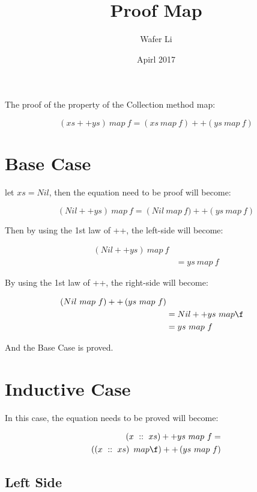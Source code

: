 \documentclass[12pt, letterpaper, twoside]{article}
\title{Proof Map}
\author{Wafer Li}
\date{Apirl 2017}
\begin{document}
\begin{titlepage}
\maketitle
\end{titlepage}

The proof of the property of the Collection method map:

$$
\left( xs ++ ys \right) \ map \ f = \left (xs \ map \ f \right) ++ \left(ys \ map \ f \right)
$$

\section{Base Case}

let $xs = Nil$, then the equation need to be proof will become:

$$
\left ( Nil ++ ys \right) \ map \ f = \left ( Nil \ map \ f) ++ \left(ys \ map \ f \right)
$$

Then by using the 1st law of ++, the left-side will become:

$$
\begin{aligned}
\left ( Nil ++ ys \right ) \ map \ f \\
&= ys \ map \ f
\end{aligned}
$$

By using the 1st law of ++, the right-side will become:

$$
\begin{aligned}
\left( Nil \ map \ f \right) ++ \left( ys \ map \ f \right) \\
&= Nil ++ ys \ map \f \\
&= ys \ map \ f
\end{aligned}
$$

And the Base Case is proved.

\section{Inductive Case}

In this case, the equation needs to be proved will become:

$$
\begin{aligned}
\left( x\ ::\ xs \right) ++ ys \ map \ f = \\
\left( \left( x\ ::\ xs \right) \ map \f \right) ++ \left( ys\ map\ f \right)
\end{aligned}
$$

\subsection{Left Side}
\end{document}
